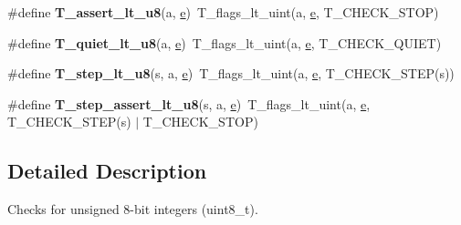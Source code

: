 \begin{DoxyCompactItemize}
\item 
\mbox{\label{group__RTEMSTestFrameworkChecksUInt8_ga6305be4679f37f2bbf1afd36411d05b3}} 
\#define {\bfseries T\+\_\+assert\+\_\+lt\+\_\+u8}(a,  \mbox{\hyperlink{sun4u_2tte_8h_a8b0b9ed08e0e18920ec2682f48228c27}{e}})~T\+\_\+flags\+\_\+lt\+\_\+uint(a, \mbox{\hyperlink{sun4u_2tte_8h_a8b0b9ed08e0e18920ec2682f48228c27}{e}}, T\+\_\+\+C\+H\+E\+C\+K\+\_\+\+S\+T\+OP)
\item 
\mbox{\label{group__RTEMSTestFrameworkChecksUInt8_gac6839d55a8a7666109b29f5cec3ee9aa}} 
\#define {\bfseries T\+\_\+quiet\+\_\+lt\+\_\+u8}(a,  \mbox{\hyperlink{sun4u_2tte_8h_a8b0b9ed08e0e18920ec2682f48228c27}{e}})~T\+\_\+flags\+\_\+lt\+\_\+uint(a, \mbox{\hyperlink{sun4u_2tte_8h_a8b0b9ed08e0e18920ec2682f48228c27}{e}}, T\+\_\+\+C\+H\+E\+C\+K\+\_\+\+Q\+U\+I\+ET)
\item 
\mbox{\label{group__RTEMSTestFrameworkChecksUInt8_ga000387e20896c16917221cf713fe57dc}} 
\#define {\bfseries T\+\_\+step\+\_\+lt\+\_\+u8}(s,  a,  \mbox{\hyperlink{sun4u_2tte_8h_a8b0b9ed08e0e18920ec2682f48228c27}{e}})~T\+\_\+flags\+\_\+lt\+\_\+uint(a, \mbox{\hyperlink{sun4u_2tte_8h_a8b0b9ed08e0e18920ec2682f48228c27}{e}}, T\+\_\+\+C\+H\+E\+C\+K\+\_\+\+S\+T\+EP(s))
\item 
\mbox{\label{group__RTEMSTestFrameworkChecksUInt8_ga9092b8161190f79a720a5ec7e0860466}} 
\#define {\bfseries T\+\_\+step\+\_\+assert\+\_\+lt\+\_\+u8}(s,  a,  \mbox{\hyperlink{sun4u_2tte_8h_a8b0b9ed08e0e18920ec2682f48228c27}{e}})~T\+\_\+flags\+\_\+lt\+\_\+uint(a, \mbox{\hyperlink{sun4u_2tte_8h_a8b0b9ed08e0e18920ec2682f48228c27}{e}}, T\+\_\+\+C\+H\+E\+C\+K\+\_\+\+S\+T\+EP(s) $\vert$ T\+\_\+\+C\+H\+E\+C\+K\+\_\+\+S\+T\+OP)
\end{DoxyCompactItemize}


\subsection{Detailed Description}
Checks for unsigned 8-\/bit integers (uint8\+\_\+t). 

